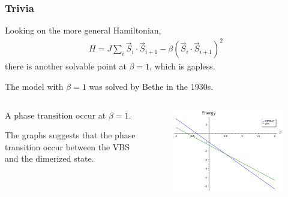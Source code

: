 \documentclass{beamer}
\begin{document}
\begin{frame}
    \frametitle{Trivia}
    Looking on the more general Hamiltonian, 
    \begin{align*}
        H = J \sum_i \vec{S}_{i} \cdot \vec{S}_{i+1} - \beta (\vec{S}_{i} \cdot \vec{S}_{i+1})^2
    \end{align*}
    there is another solvable point at $\beta = 1$, which is gapless. 
    \pause 

    The model with $\beta = 1$ was solved by Bethe in the 1930s. 
    \pause 
    \begin{columns}
    \begin{column}{0.3\textwidth}
        A phase transition occur at $\beta = 1$. 
        \pause 

        The graphs suggests that the phase transition occur between the VBS and the dimerized state.
    \end{column}
    \begin{column}{0.7\textwidth}
        \begin{figure}[h]
            \centering
            \includegraphics[scale=0.4]{tmp_z_h7tj6o.png}
        \end{figure}
    \end{column}
    \end{columns}
    


    

\end{frame}
\end{document}
